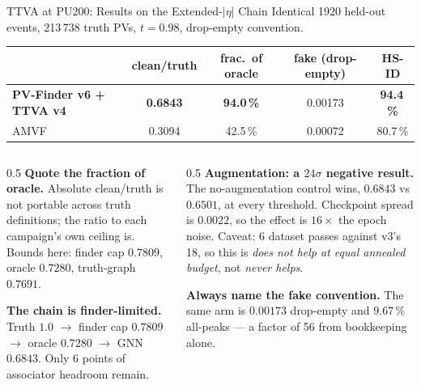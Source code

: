 \documentclass[xcolor=table,aspectratio=169]{beamer}
\begin{document}
\begin{frame}[shrink=15]{TTVA at PU200: Results on the Extended-$|\eta|$ Chain}
    \small
    Identical 1920 held-out events, 213\,738 truth PVs, $t=0.98$, drop-empty convention.
    \vspace{0.4em}

    \begin{center}
    \begin{tabular}{lcccc}
        \hline
        & clean/truth & \textbf{frac.\ of oracle} & fake (drop-empty) & HS-ID \\
        \hline
        \textbf{PV-Finder v6 + TTVA v4} & \textbf{0.6843} & \textbf{94.0\,\%} & 0.00173 & \textbf{94.4\,\%} \\
        AMVF & 0.3094 & 42.5\,\% & 0.00072 & 80.7\,\% \\
        \hline
    \end{tabular}
    \end{center}
    \vspace{0.3em}

    \begin{columns}[t]
        \begin{column}{0.5\linewidth}
            \textbf{Quote the fraction of oracle.} Absolute clean/truth is not
            portable across truth definitions; the ratio to each campaign's own
            ceiling is. Bounds here: finder cap $0.7809$, oracle $0.7280$,
            truth-graph $0.7691$.
            \vspace{0.4em}

            \textbf{The chain is finder-limited.} Truth $1.0$ $\to$ finder cap
            $0.7809$ $\to$ oracle $0.7280$ $\to$ GNN $0.6843$. Only 6 points of
            associator headroom remain.
        \end{column}
        \begin{column}{0.5\linewidth}
            \textbf{Augmentation: a $24\sigma$ negative result.} The
            no-augmentation control wins, $0.6843$ vs $0.6501$, at every threshold.
            Checkpoint spread is $0.0022$, so the effect is $16\times$ the epoch
            noise. Caveat: 6 dataset passes against v3's 18, so this is
            \emph{does not help at equal annealed budget}, not \emph{never helps}.
            \vspace{0.4em}

            \textcolor{pennred}{\textbf{Always name the fake convention.}} The same
            arm is $0.00173$ drop-empty and $9.67\,\%$ all-peaks --- a factor of 56
            from bookkeeping alone.
        \end{column}
    \end{columns}
\end{frame}
\end{document}
